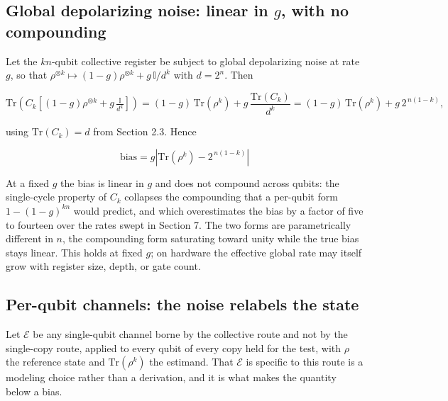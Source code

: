 \documentclass[a4paper,superscriptaddress,nofootinbib,onecolumn,nopdfoutputerror]{quantumarticle}
\begin{document}
\hypertarget{global-depolarizing-noise-linear-in-g-with-no-compounding}{%
\subsection{\texorpdfstring{Global depolarizing noise: linear in
\(g\), with no
compounding}{Global depolarizing noise: linear in g, with no compounding}}\label{global-depolarizing-noise-linear-in-g-with-no-compounding}}

Let the \(kn\)-qubit collective register be subject to global
depolarizing noise at rate \(g\), so that
\(\rho^{\otimes k} \mapsto (1-g)\rho^{\otimes k} + g\,\mathbb{I}/d^k\)
with \(d = 2^n\). Then

\[\mathrm{Tr}\!\left( C_k \left[ (1-g)\rho^{\otimes k} + g\,\tfrac{\mathbb{I}}{d^k} \right] \right) = (1-g)\,\mathrm{Tr}(\rho^k) + g\,\frac{\mathrm{Tr}(C_k)}{d^k} = (1-g)\,\mathrm{Tr}(\rho^k) + g\, 2^{\,n(1-k)},\]

using \(\mathrm{Tr}(C_k) = d\) from Section 2.3. Hence

\[\boxed{\;\text{bias} = g \left| \mathrm{Tr}(\rho^k) - 2^{\,n(1-k)} \right| \;}\]

At a fixed \(g\) the bias is linear in \(g\) and does not compound
across qubits: the single-cycle property of \(C_k\) collapses the
compounding that a per-qubit form \(1 - (1-g)^{kn}\) would predict, and
which overestimates the bias by a factor of five to fourteen over the rates swept in
Section 7. The two forms are parametrically different in \(n\),
the compounding form saturating toward unity while the true bias stays
linear. This holds at fixed \(g\); on hardware the effective global rate
may itself grow with register size, depth, or gate count.

\hypertarget{per-qubit-channels-the-noise-relabels-the-state}{%
\subsection{Per-qubit channels: the noise relabels the
state}\label{per-qubit-channels-the-noise-relabels-the-state}}

Let \(\mathcal{E}\) be any single-qubit channel borne by the collective
route and not by the single-copy route, applied to every qubit of every
copy held for the test, with \(\rho\) the reference state and
\(\mathrm{Tr}(\rho^k)\) the estimand. That \(\mathcal{E}\) is specific
to this route is a modeling choice rather than a derivation, and it is
what makes the quantity below a bias.
\end{document}
